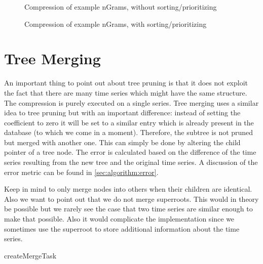 \begin{figure}
    \centering
    
    \caption{Compression of example nGrams, without sorting/prioritizing}\label{fig:ngrams_ex2_compression_unsorted}
\end{figure}

\begin{figure}
    \centering
    
    \caption{Compression of example nGrams, with sorting/prioritizing}\label{fig:ngrams_ex2_compression_sorted}
\end{figure}



\section{Tree Merging}
\label{sec:algorithm:merge}

An important thing to point out about tree pruning is that it does not exploit the fact that there are many time series which might have the same structure. The compression is purely executed on a single series. Tree merging uses a similar idea to tree pruning but with an important difference: instead of setting the coefficient to zero it will be set to a similar entry which is already present in the database (to which we come in a moment). Therefore, the subtree is not pruned but merged with another one. This can simply be done by altering the child pointer of a tree node. The error is calculated based on the difference of the time series resulting from the new tree and the original time series. A discussion of the error metric can be found in \autoref{sec:algorithm:error}.

Keep in mind to only merge nodes into others when their children are identical. Also we want to point out that we do not merge superroots. This would in theory be possible but we rarely see the case that two time series are similar enough to make that possible. Also it would complicate the implementation since we sometimes use the superroot to store additional information about the time series.

\begin{algorithm}



    \caption{createMergeTask}\label{algo:createMergeTask}
\end{algorithm}

